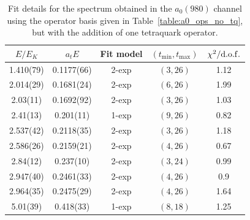 \begin{table}
  \centering
  \begin{tabular}{c|c|c|c|c}
    $E / E_K$ & $a_t E$ & Fit model & $(t_{\mathrm{min}}, {t_\mathrm{max}})$ & $\chi^2 / \rm{d.o.f.}$\\
    \hline
    1.410(79)&0.1177(66)&2{-}exp&$(3, 26)$&1.12\\
    2.014(29)&0.1681(24)&2{-}exp&$(6, 26)$&1.99\\
    2.03(11)&0.1692(92)&2{-}exp&$(3, 26)$&1.03\\
    2.41(13)&0.201(11)&1{-}exp&$(9, 26)$&0.82\\
    2.537(42)&0.2118(35)&2{-}exp&$(3, 26)$&1.18\\
    2.586(26)&0.2159(21)&2{-}exp&$(4, 26)$&0.67\\
    2.84(12)&0.237(10)&2{-}exp&$(3, 24)$&0.99\\
    2.947(40)&0.2461(33)&2{-}exp&$(4, 26)$&0.9\\
    2.964(35)&0.2475(29)&2{-}exp&$(4, 26)$&1.64\\
    5.01(39)&0.418(33)&1{-}exp&$(8, 18)$&1.25
  \end{tabular}
  \caption{Fit details for the spectrum obtained in the $a_0(980)$ channel using the operator basis given in Table~\ref{table:a0_ops_no_tq}, but with the addition of one tetraquark operator.}
  \label{table:a0_with_tq_spectrum}
\end{table}

